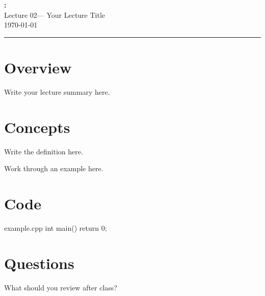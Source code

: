 \documentclass[../main.tex]{subfiles}
\begin{document}
\gdef\lecturenum{02}
\gdef\lecturetitle{Your Lecture Title}
\gdef\lecturedate{\today}
\setcounter{section}{0}

\begin{center}
{\Large\bfseries \coursename: \coursetitle}\\[3pt]
{\large Lecture \lecturenum --- \lecturetitle}\\[3pt]
\lecturedate
\end{center}
\vspace{.5em}\hrule\vspace{1em}

\section{Overview}
Write your lecture summary here.

\section{Concepts}
\begin{definitionbox}
Write the definition here.
\end{definitionbox}

\begin{examplebox}
Work through an example here.
\end{examplebox}

\section{Code}
\begin{intellijcode}{example.cpp}
int main() {
    return 0;
}
\end{intellijcode}

\section{Questions}
\begin{questionbox}
What should you review after class?
\end{questionbox}
\end{document}
